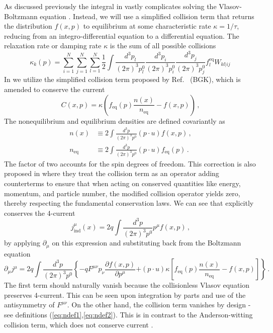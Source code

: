 As discussed previously the integral in  vastly complicates solving the Vlasov-Boltzmann equation . Instead, we will use a simplified collision term that returns the distribution $f(x,p)$ to equilibrium at some characteristic rate $\kappa = 1/\tau$, reducing  from an integro-differential equation to a differential equation. The relaxation rate or damping rate $\kappa$ is the sum of all possible collisions~\cite{Das:2021bkz}
\begin{equation}
    \kappa_k(p) = \sum^N_{i=1}\sum^N_{j=1}\sum^N_{l=1} \frac{1}{2}\int\frac{d^3p_l}{(2 \pi)^3p_l^0}\frac{d^3p_i}{(2 \pi)^3p_i^0}\frac{d^3p_j}{(2 \pi)^3p_j^0}f_l^{\text{eq}}W_{kl|ij}\,
\end{equation}
In \cite{Formanek:2021blc} we utilize the simplified collision term proposed by Ref.~\cite{Bhatnagar:1954zz} (BGK), which is amended to conserve the current 
\begin{equation}\label{eq:collision}
    \boxed{C(x,p) =\kappa\left(f_{\text{eq}}(p)\frac{n(x)}{{n_{\text{eq}}}} - f(x,p)\right)}\,,
\end{equation}
The nonequilibrium and equilibrium densities are defined covariantly as
\begin{align}
\label{eq:ndef1}n(x) &\equiv 2 \int \frac{d^3p}{(2\pi)^3p^0}(p \cdot u)f(x,p)\,,\\
\label{eq:ndef2}n_\mathrm{eq} &\equiv 2\int \frac{d^3p}{(2\pi)^3p^0}(p \cdot u) f_\mathrm{eq}(p)\,.
\end{align}
The factor of two accounts for the spin degrees of freedom. This correction is also proposed in \cite{Rocha:2021zcw} where they treat the collision term as an operator adding counterterms to ensure that when acting on conserved quantities like energy, momentum, and particle number, the modified collision operator yields zero, thereby respecting the fundamental conservation laws. We can see that  explicitly conserves the 4-current~\cite{Formanek:2021blc}
\begin{equation}\label{eq:jmudef}
j_{\mathrm{ind}}^\mu (x)= 2q \int \frac{d^3p}{(2\pi)^3p^0}p^\mu f(x,p)\,,
\end{equation}
by applying $\partial_\mu$ on this expression and substituting back from the Boltzmann equation 
\begin{equation}
\partial_\mu j^\mu = 2q \int \frac{d^3p}{(2\pi)^3p^0} \left\{-q F^{\mu\nu}p_\nu \frac{\partial f(x,p)}{\partial p^\mu}\right. 
\left. + (p \cdot u)\kappa \left[f_\mathrm{eq}(p) \frac{n(x)}{n_\mathrm{eq}}-f(x,p) \right] \right\}\,.
\end{equation} 
The first term should naturally vanish because the collisionless Vlasov equation preserves 4-current. This can be seen upon integration by parts and use of the antisymmetry of $F^{\mu\nu}$. On the other hand, the collision term vanishes by design - see definitions (\ref{eq:ndef1},\ref{eq:ndef2}). This is in contrast to the Anderson-witting collision term, which does not conserve current .

